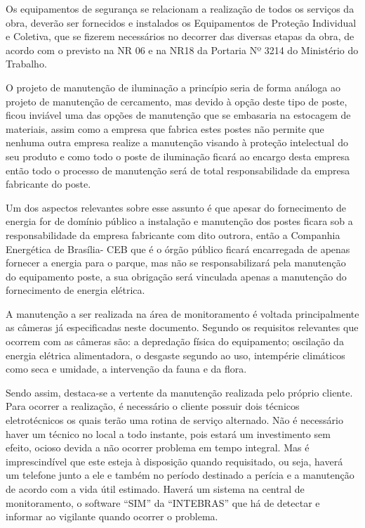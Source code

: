 	Os equipamentos de segurança se relacionam a realização de todos os serviços da obra, deverão ser fornecidos e instalados os Equipamentos de Proteção Individual e Coletiva, que se fizerem necessários no decorrer das diversas etapas da obra, de acordo com o previsto na NR 06 e na NR18 da Portaria Nº 3214 do Ministério do Trabalho.	
	
	O projeto de manutenção de iluminação a princípio seria de forma análoga ao projeto de manutenção de cercamento, mas devido à opção deste tipo de poste, ficou inviável uma das opções de manutenção que se embasaria na estocagem de materiais, assim como a empresa que fabrica estes postes não permite que nenhuma outra empresa realize a manutenção visando à proteção intelectual do seu produto e como todo o poste de iluminação ficará ao encargo desta empresa então todo o processo de manutenção será de total responsabilidade da empresa fabricante do poste.
	
	Um dos aspectos relevantes sobre esse assunto é que apesar do fornecimento de energia for de domínio público a instalação e manutenção dos postes ficara sob a responsabilidade da empresa fabricante com dito outrora, então a Companhia Energética de Brasília- CEB que é o órgão público ficará encarregada de apenas fornecer a energia para o parque, mas não se responsabilizará pela manutenção do equipamento poste, a sua obrigação será vinculada apenas a manutenção do fornecimento de energia elétrica. 	
	
	A manutenção a ser realizada na área de monitoramento é voltada principalmente as câmeras já especificadas neste documento. Segundo os requisitos relevantes que ocorrem com as câmeras são: a depredação física do equipamento; oscilação da energia elétrica alimentadora, o desgaste segundo ao uso, intempérie climáticos como seca e umidade, a intervenção da fauna e da flora.
	
	Sendo assim, destaca-se a vertente da manutenção realizada pelo próprio cliente. Para ocorrer a realização, é necessário o cliente possuir dois técnicos eletrotécnicos os quais terão uma rotina de serviço alternado. Não é necessário haver um técnico no local a todo instante, pois estará um investimento sem efeito, ocioso devida a não ocorrer problema em tempo integral. Mas é imprescindível que este esteja à disposição quando requisitado, ou seja, haverá um telefone junto a ele e também no período destinado a perícia e a manutenção de acordo com a vida útil estimado. Haverá um sistema na central de monitoramento, o software “SIM” da “INTEBRAS” que há de detectar e informar ao vigilante quando ocorrer o problema.
	
